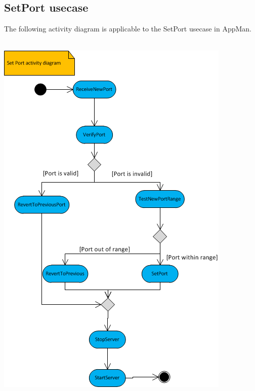 \documentclass[a4paper,12pt,final]{article}
\begin{document}
\newpage
\subsection{SetPort usecase}
The following activity diagram is applicable to the SetPort usecase in AppMan.\\
\textbf{\\}
\begin{center}
\includegraphics[scale=1]{SetPort.png}
\end{center}




\newpage
\end{document}
